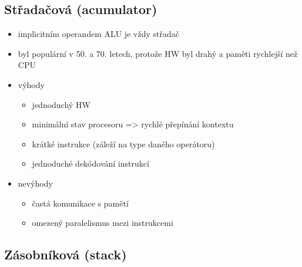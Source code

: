 \documentclass{szzclass}
\providecommand{\tightlist}{%
  \setlength{\itemsep}{0pt}\setlength{\parskip}{0pt}}
\begin{document}
\pagebreak

\hypertarget{stux159adaux10dovuxe1-acumulator}{%
\subsection{Střadačová
(acumulator)}\label{stux159adaux10dovuxe1-acumulator}}

\begin{itemize}
\tightlist
\item
  implicitním operandem ALU je vždy střadač
\item
  byl populární v 50. a 70. letech, protože HW byl drahý a paměti
  rychlejší než CPU
\item
  výhody

  \begin{itemize}
  \tightlist
  \item
    jednoduchý HW
  \item
    minimální stav procesoru =\textgreater{} rychlé přepínání kontextu
  \item
    krátké instrukce (záleží na type daného operátoru)
  \item
    jednoduché dekódování instrukcí
  \end{itemize}
\item
  nevýhody

  \begin{itemize}
  \tightlist
  \item
    častá komunikace s pamětí
  \item
    omezený paralelismus mezi instrukcemi
  \end{itemize}
\end{itemize}

\hypertarget{zuxe1sobnuxedkovuxe1-stack}{%
\subsection{Zásobníková (stack)}\label{zuxe1sobnuxedkovuxe1-stack}}
\end{document}
